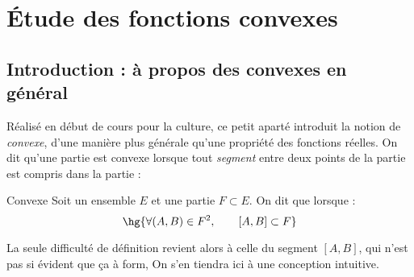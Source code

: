 \documentclass[a4paper,french,bookmarks]{report}
\begin{document}
\initcours{}

\section{Étude des fonctions convexes}

\subsection{Introduction : à propos des convexes en général}

Réalisé en début de cours pour la culture, ce petit aparté introduit
la notion de \textit{convexe}, d'une manière plus générale qu'une
propriété des fonctions réelles. On dit qu'une partie est convexe
lorsque tout \textit{segment} entre deux points de la partie est
compris dans la partie :

\begin{definition}{Convexe}{}
    Soit un ensemble $E$ et une partie $F \subset E$. On dit que
     lorsque :
    \[ \hg{\forall (A, B) \in F^2,\qquad [A, B] \subset F}\]
\end{definition}

La seule difficulté de définition revient alors à celle du segment
$[A, B]$, qui n'est pas si évident que ça à form, On s'en tiendra ici
à une conception intuitive.
\end{document}
